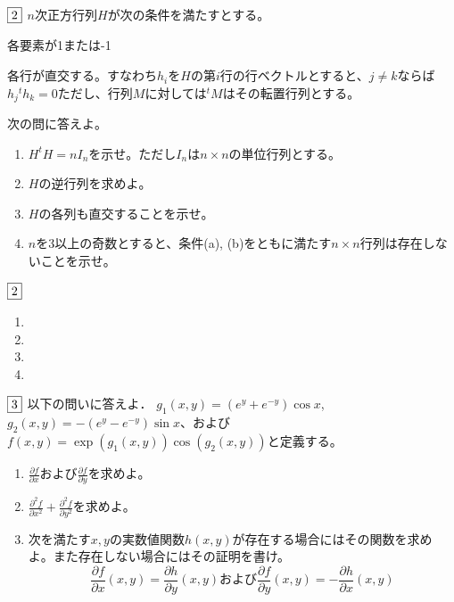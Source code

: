 \documentclass[dvipdfmx]{jsreport}
\begin{document}
\begin{tcolorbox} %
	$\fbox{2}$ $n$次正方行列$H$が次の条件を満たすとする。
\begin{enumerate_alpha}
	\item 各要素が1または-1
	\item 各行が直交する。すなわち$h_i$を$H$の第$i$行の行ベクトルとすると、$j\ne k$ならば$h_j{}^t h_k= 0$ただし、行列$M$に対しては${}^t M$はその転置行列とする。
\end{enumerate_alpha}
	次の問に答えよ。
\begin{enumerate}
	\item $H^t H= nI_n$を示せ。ただし$I_n$は$n\times n$の単位行列とする。
	\item  $H$の逆行列を求めよ。
	\item $H$の各列も直交することを示せ。
	\item $n$を3以上の奇数とすると、条件(a), (b)をともに満たす$n\times n$行列は存在しないことを示せ。
\end{enumerate}
\end{tcolorbox}

\begin{souanswer} %
	$\fbox{2}$
\begin{enumerate}
	\item 
	\item 
	\item 
	\item 
\end{enumerate}
\end{souanswer}

\begin{tcolorbox} %
	$\fbox{3}$ 以下の問いに答えよ．
	$g_1(x, y)= (e^y+ e^{-y})\cos{x}$, $g_2(x, y)= -(e^y- e^{-y})\sin{x}$、および$f(x, y)= \exp{(g_1(x, y))}\cos{(g_2(x, y))}$と定義する。
\begin{enumerate}
	\item $\frac{\partial f}{\partial x}$および$\frac{\partial f}{\partial y}$を求めよ。
	\item $\frac{\partial^2 f}{\partial x^2}+ \frac{\partial^2 f}{\partial y^2}$を求めよ。
	\item 次を満たす$x, y$の実数値関数$h(x, y)$が存在する場合にはその関数を求めよ。また存在しない場合にはその証明を書け。
\begin{equation*}
	\frac{\partial f}{\partial x}(x, y)= \frac{\partial h}{\partial y}(x, y) および\frac{\partial f}{\partial y}(x, y)= -\frac{\partial h}{\partial x}(x, y)
\end{equation*}
\end{enumerate}
\end{tcolorbox}
\end{document}
